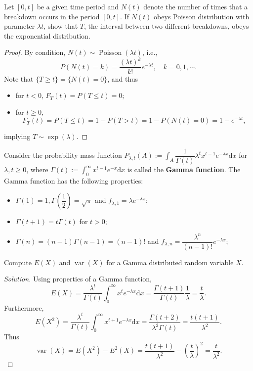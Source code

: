 \documentclass[11pt,singlecolumn, openany, citestyle=authoryear]{elegantbook}
\begin{document}
\begin{CJK}{UTF8}{gbsn}
\begin{example}
    Let $[0,t]$ be a given time period and $N(t)$ denote the number of times that a breakdown occurs in the period $[0,t]$. If 
    $N(t)$ obeys Poisson distribution with parameter $\lambda t$, show that $T$, the interval between two different
    breakdowns, obeys the exponential distribution. 
\end{example}
\begin{proof}
    By condition, $N(t)\sim\operatorname*{Poisson}(\lambda t)$, i.e.,
    $$
    P(N(t)=k)=\frac{(\lambda t)^k}{k!}e^{-\lambda t}, \quad 
    k=0,1,\cdots.
    $$
    Note that $\{T\geqslant t\}=\{N(t)=0\}$, and thus 
    \begin{itemize}
        \item for $t<0$, $F_T(t)=P(T\leqslant t)=0$;
        \item for $t\geqslant 0$,
        $$
        F_T(t)=P(T\leqslant t) = 1-P(T>t)=1-P(N(t)=0)=1-e^{-\lambda t},
        $$
    \end{itemize}
    implying $T\sim \operatorname{exp}(\lambda)$.
\end{proof}

\begin{example}
    Consider the probability mass function 
    $P_{\lambda, t}(A):=\displaystyle \int_{A} 
    \dfrac{1}{\Gamma(t)}\lambda^t x^{t-1}e^{-\lambda x}\mathrm{d}x$ for $\lambda, t \geqslant 0$,
    where $\Gamma(t):=\displaystyle \int_{0}^\infty x^{t-1}e^{-x}\mathrm{d}x$ is called 
    the \textbf{Gamma function}. The Gamma function has the following properties: 
    \begin{itemize}
        \item $\Gamma(1)=1, \Gamma\left(\dfrac{1}{2}\right)=\sqrt{\pi}$ 
        and $f_{\lambda,1}=\lambda e^{-\lambda x}$;
        \item $\Gamma(t+1)=t\Gamma(t)$ for $t>0$;
        \item $\Gamma(n)=(n-1)\Gamma(n-1) =(n-1)!$ and $f_{\lambda,n}=\dfrac{\lambda^n}{(n-1)!}
        e^{-\lambda x}$;
    \end{itemize}
\end{example}
\begin{exercise}
    Compute $E(X)$ and $\operatorname{var}(X)$ for a Gamma distributed random variable $X$.
\end{exercise}
\begin{proof}[Solution]
    Using properties of a Gamma function, 
    $$
    E(X)=\frac{\lambda^t}{\Gamma(t)}\int_0^\infty x^te^{-\lambda x}\mathrm{d}x=
    \frac{\Gamma(t+1)}{\Gamma(t)}\frac{1}{\lambda}=\frac{t}{\lambda}.
    $$
    Furthermore,
    $$
    E(X^2)=\frac{\lambda^t}{\Gamma(t)}\int_0^\infty x^{t+1}e^{-\lambda x}\mathrm{d}x=
    \frac{\Gamma(t+2)}{\lambda^2\Gamma(t)}=\frac{t(t+1)}{\lambda^2}.
    $$
    Thus 
    $$
    \operatorname{var}(X)=E(X^2)-E^2(X)=\frac{t(t+1)}{\lambda^2}-\left(\frac{t}{\lambda}
    \right)^2=\frac{t}{\lambda^2}.
    $$
\end{proof}


\end{CJK}
\end{document}
